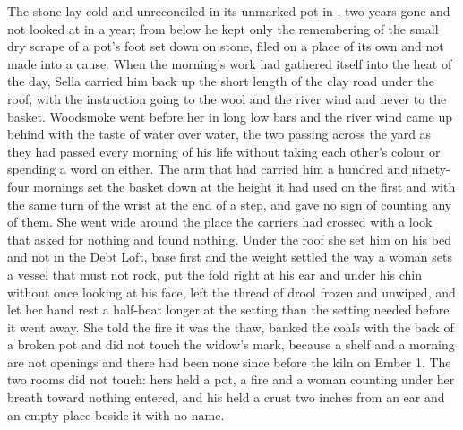 The stone lay cold and unreconciled in its unmarked pot in , two years gone and not looked at in a year; from below he kept only the remembering of the small dry scrape of a pot's foot set down on stone, filed on a place of its own and not made into a cause. When the morning's work had gathered itself into the heat of the day, Sella carried him back up the short length of the clay road under the roof, with the instruction going to the wool and the river wind and never to the basket. Woodsmoke went before her in long low bars and the river wind came up behind with the taste of water over water, the two passing across the yard as they had passed every morning of his life without taking each other's colour or spending a word on either. The arm that had carried him a hundred and ninety-four mornings set the basket down at the height it had used on the first and with the same turn of the wrist at the end of a step, and gave no sign of counting any of them. She went wide around the place the carriers had crossed with a look that asked for nothing and found nothing. Under the roof she set him on his bed and not in the Debt Loft, base first and the weight settled the way a woman sets a vessel that must not rock, put the fold right at his ear and under his chin without once looking at his face, left the thread of drool frozen and unwiped, and let her hand rest a half-beat longer at the setting than the setting needed before it went away. She told the fire it was the thaw, banked the coals with the back of a broken pot and did not touch the widow's mark, because a shelf and a morning are not openings and there had been none since before the kiln on Ember 1. The two rooms did not touch: hers held a pot, a fire and a woman counting under her breath toward nothing entered, and his held a crust two inches from an ear and an empty place beside it with no name.

